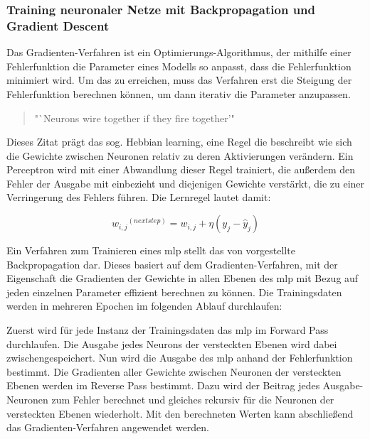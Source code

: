 \subsubsection{Training neuronaler Netze mit Backpropagation und Gradient Descent}
\label{chap:Training neuronaler Netze mit Backpropagation und Gradient Descent}

Das Gradienten-Verfahren ist ein Optimierungs-Algorithmus, der mithilfe einer Fehlerfunktion die Parameter eines Modells so anpasst, dass die Fehlerfunktion minimiert wird. Um das zu erreichen, muss das Verfahren erst die Steigung der Fehlerfunktion berechnen können, um dann iterativ die Parameter anzupassen. \cite[vgl. S. 118]{Geron2019}

\begin{quote}
  "`Neurons wire together if they fire together'" \cite{Lowel1992}
\end{quote}

Dieses Zitat prägt das sog. Hebbian learning, eine Regel die beschreibt wie sich die Gewichte zwischen Neuronen relativ zu deren Aktivierungen verändern. Ein Perceptron wird mit einer Abwandlung dieser Regel trainiert, die außerdem den Fehler der Ausgabe mit einbezieht und diejenigen Gewichte verstärkt, die zu einer Verringerung des Fehlers führen. \cite[vgl. S. 289 ff.]{Geron2019} Die Lernregel lautet damit:

\[{w_{i,j}}^{(next step)}=w_{i,j}+\eta(y_j-\hat{y}_j)\]

Ein Verfahren zum Trainieren eines \ac{mlp} stellt das von \cite{Rumelhart1986} vorgestellte Backpropagation dar. Dieses basiert auf dem Gradienten-Verfahren, mit der Eigenschaft die Gradienten der Gewichte in allen Ebenen des \ac{mlp} mit Bezug auf jeden einzelnen Parameter effizient berechnen zu können. Die Trainingsdaten werden in mehreren Epochen im folgenden Ablauf durchlaufen:

Zuerst wird für jede Instanz der Trainingsdaten das \ac{mlp} im Forward Pass durchlaufen. Die Ausgabe jedes Neurons der versteckten Ebenen wird dabei zwischengespeichert. Nun wird die Ausgabe des \ac{mlp} anhand der Fehlerfunktion bestimmt. Die Gradienten aller Gewichte zwischen Neuronen der versteckten Ebenen werden im Reverse Pass bestimmt. Dazu wird der Beitrag jedes Ausgabe-Neuronen zum Fehler berechnet und gleiches rekursiv für die Neuronen der versteckten Ebenen wiederholt. Mit den berechneten Werten kann abschließend das Gradienten-Verfahren angewendet werden. \cite[S. 286]{Geron2019}
